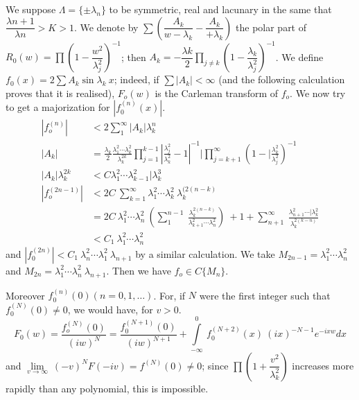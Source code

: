 We suppose $\Lambda = \{\pm \lambda_n \}$ to be symmetric, real and
lacunary in the same that $\dfrac{\lambda n+1}{\lambda n} > K > 1$. We
denote by $\sum ( \dfrac{A_k}{w - \lambda_k} - \dfrac{A_k}{+
 \lambda_k})$ the polar part of $R_0(w) = \prod (1 -
\dfrac{w^2}{\lambda^2_j})^{-1}$; then $A_k = - \dfrac{\lambda k}{2}
\prod\limits_{j \neq k} (1 - \dfrac{\lambda_k}{\lambda^2_j})^{-1}$. We\pageoriginale
define $f_0 (x) = 2 \sum A_k \sin \lambda_k ~ x$; indeed, if $\sum |
A_k | < \infty$ (and the following calculation proves that it is
realised), $F_o(w)$ is the Carleman transform of $f_o$. We now try to
get a majorization for $| f^{(n)}_0 (x) |$. 
\begin{align*}
 |f_o^{(n)} | & < 2 \sum^\infty_1 | A_k | \lambda^n_k\\
 | A_k | & = \frac{\lambda_k}{2} \frac{\lambda^2_1 \cdots
 \lambda^2_k}{\lambda_k^{2k}} \prod\limits_{j=1}^{k-1} 
 | \frac{\lambda^2_j}{\lambda^2_k} - 1 |^{-1}
 | \prod\limits^{\infty}_{j=k+1} \left(1-
 | \frac{\lambda^2_k}{\lambda^2_j}\right)^{-1}\\ 
 | A_k | \lambda^{2k}_k & < C \lambda^2_1 \cdots \lambda^2_{k-1}
 | \lambda^3_k\\ 
 | f^{(2n-1)}_o | & < 2C ~ \sum_{k=1}^\infty \lambda^2_1 \cdots
 \lambda^2_k ~ \lambda^{(2(n-k)}_{k}\\ 
 & = 2C ~ \lambda^2_1 \cdots \lambda^2_n ~ \left(\sum^{n-1}_{1} ~
 \frac{\lambda^{2(n-k)}_k}{\lambda^2_{k+1}\cdots \lambda^2_n}\right)
 ~ + 1 + \sum^\infty_{n+1} ~ \frac{\lambda^2_{n+1}\cdots
 | \lambda^2_k}{\lambda^{2(k-n)}_k}\\ 
 & < C_1 ~ \lambda^2_1 \cdots \lambda^2_n
\end{align*}
and $| f^{(2n)}_0 | < C_1 ~ \lambda^2_n \cdots \lambda^2_1 ~
\lambda_{n+1}$ by a similar calculation. We take $M_{2n-1} =
\lambda^2_1 \cdots \lambda^2_n$ and $M_{2n} = \lambda_1^2 \cdots
\lambda_n^2 ~ \lambda_{n+1}$. Then we have $f_o \in C\{ M_n\}$. 

Moreover $f^{(n)}_0 (0) (n = 0,1, \ldots)$. For, if $N$ were the first
integer such that $f^{(N)}_0 (0) \neq 0$, we would have, for $v > 0$. 
$$
F_0(w) = \frac{f_o^{(N)}(0)}{(iw)^N} =
\frac{f_0^{(N+1)}(0)}{(iw)^{N+1}} + \int\limits_{- \infty}^0 ~
f_0^{(N+2)} (x) ~ (ix)^{-N-1} e^{-ixw} {dx} 
$$
and $\lim\limits_{v \rightarrow \infty} ~ (-v)^{N} F(-iv) = f^{(N)}(0)
\neq 0$; since $\prod(1 + \dfrac{v^2}{\lambda^2_k})$ increases more
rapidly than any polynomial, this is impossible. 


